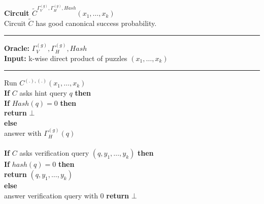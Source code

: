 


\begin{codeblock}
  \textbf{Circuit $\widetilde{C}^{\Gamma_V^{(g)}, \Gamma_H^{(g)}, Hash} (x_1, \dots, x_k)$} \\
  Circuit $\widetilde{C}$ has good canonical success probability.
  \medskip

  \hrule

  \medskip

  \textbf{Oracle:} $\Gamma_V^{(g)}, \Gamma_H^{(g)}, Hash$ \\
  \textbf{Input:} k-wise direct product of puzzles $(x_1, \dots, x_k)$ \\

  \medskip\hrule\medskip
  Run $C^{(.), (.)}(x_1, \dots, x_k)$ \\
  \IndI \textbf{If} $C$ asks hint query $q$ \textbf{then}\\
  \IndII \textbf{If} $Hash(q) = 0$ \textbf{then}\\
  \IndIII \textbf{return} $\bot$\\
  \IndII \textbf{else}\\
  \IndIII answer with $\Gamma_H^{(g)}(q)$\\
  \\
  \IndI \textbf{If} $C$ asks verification query $(q, y_1, \dots, y_k)$ \textbf{then} \\
  \IndII \textbf{If} $hash(q) = 0$ \textbf{then} \\
  \IndIII \textbf{return} $(q, y_1, \dots, y_k)$ \\
  \IndII \textbf{else} \\
  \IndIII answer verification query with 0
  \textbf{return} $\bot$
\end{codeblock}


